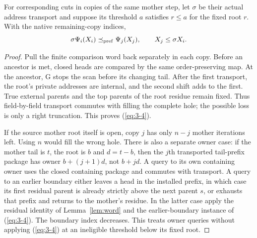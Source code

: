 \begin{lemma}\label{lem:window-transfer}
For corresponding cuts in copies of the same mother step, let $\sigma$
be their actual address transport and suppose its threshold $a$ satisfies
$r\le a$ for the fixed root $r$. With the native remaining-copy indices,
\begin{equation}\label{eq:3-4}
 \sigma\Psi_i(X_i)\preceq_{\mathrm{pref}}\Psi_j(X_j),\qquad
 X_j\le\sigma X_i.                                   
\end{equation}
\end{lemma}
\begin{proof}
Pull the finite comparison word back separately in each copy. Before an
ancestor is met, closed heads are compared by the same order-preserving
map. At the ancestor, G stops the scan before its changing tail. After
the first transport, the root's private addresses are internal, and
the second shift adds to the first. True external parents and the top
parents of the root residue remain fixed. Thus field-by-field transport
commutes with filling the complete hole; the possible loss is only a
right truncation. This proves (\ref{eq:3-4}).

If the source mother root itself is open, copy $j$ has only $n-j$
mother iterations left. Using $n$ would fill the wrong hole. There is
also a separate owner case: if the mother tail is $t$, the root is $b$
and $d=t-b$, then the $j$th transported tail-prefix package has owner
$b+(j+1)d$, not $b+jd$. A query to its own containing owner uses the
closed containing package and commutes with transport. A query to an
earlier boundary either leaves a head in the installed prefix, in which
case its first residual parent is already strictly above the next parent
$s$, or exhausts that prefix and returns to the mother's residue.
In the latter case apply the residual identity of Lemma~\ref{lem:word}
and the earlier-boundary instance of (\ref{eq:3-4}). The boundary index decreases.
This treats owner queries without applying (\ref{eq:3-4}) at an ineligible
threshold below its fixed root.
\end{proof}

